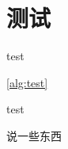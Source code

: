 \documentclass{../gdutthesis}
\begin{document}
\mainmatter

\chapter{测试}{test}

\autoref{alg:test}

\begin{center}
\begin{minipage}{1.0\linewidth}
\begin{algorithm}[H]
  \caption{test}\label{alg:test}
  \begin{algorithmic}[1]
  \STATE 说一些东西
  \end{algorithmic}
\end{algorithm}
\end{minipage}
\end{center}
\end{document}
